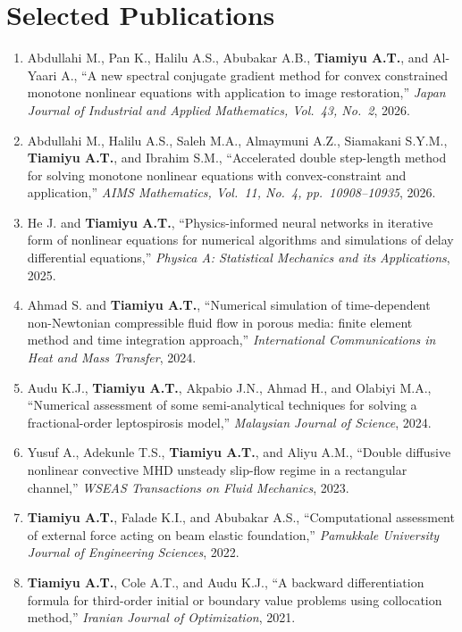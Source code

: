 \documentclass[11pt,a4paper]{article}
\newcommand{\publication}[4]{%
    \item #1, ``#2,'' \textit{#3}, #4.%
}
\begin{document}
\section{Selected Publications}

\begin{enumerate}[leftmargin=1.5em, itemsep=3pt]
    \publication{Abdullahi M., Pan K., Halilu A.S., Abubakar A.B., \textbf{Tiamiyu A.T.}, and Al-Yaari A.}{A new spectral conjugate gradient method for convex constrained monotone nonlinear equations with application to image restoration}{Japan Journal of Industrial and Applied Mathematics, Vol.~43, No.~2}{2026}
    
    \publication{Abdullahi M., Halilu A.S., Saleh M.A., Almaymuni A.Z., Siamakani S.Y.M., \textbf{Tiamiyu A.T.}, and Ibrahim S.M.}{Accelerated double step-length method for solving monotone nonlinear equations with convex-constraint and application}{AIMS Mathematics, Vol.~11, No.~4, pp.~10908--10935}{2026}
    
    \publication{He J. and \textbf{Tiamiyu A.T.}}{Physics-informed neural networks in iterative form of nonlinear equations for numerical algorithms and simulations of delay differential equations}{Physica A: Statistical Mechanics and its Applications}{2025}
    
    \publication{Ahmad S. and \textbf{Tiamiyu A.T.}}{Numerical simulation of time-dependent non-Newtonian compressible fluid flow in porous media: finite element method and time integration approach}{International Communications in Heat and Mass Transfer}{2024}
    
    \publication{Audu K.J., \textbf{Tiamiyu A.T.}, Akpabio J.N., Ahmad H., and Olabiyi M.A.}{Numerical assessment of some semi-analytical techniques for solving a fractional-order leptospirosis model}{Malaysian Journal of Science}{2024}
    
    \publication{Yusuf A., Adekunle T.S., \textbf{Tiamiyu A.T.}, and Aliyu A.M.}{Double diffusive nonlinear convective MHD unsteady slip-flow regime in a rectangular channel}{WSEAS Transactions on Fluid Mechanics}{2023}
    
    \publication{\textbf{Tiamiyu A.T.}, Falade K.I., and Abubakar A.S.}{Computational assessment of external force acting on beam elastic foundation}{Pamukkale University Journal of Engineering Sciences}{2022}
    
    \publication{\textbf{Tiamiyu A.T.}, Cole A.T., and Audu K.J.}{A backward differentiation formula for third-order initial or boundary value problems using collocation method}{Iranian Journal of Optimization}{2021}
    

\end{enumerate}
\end{document}
